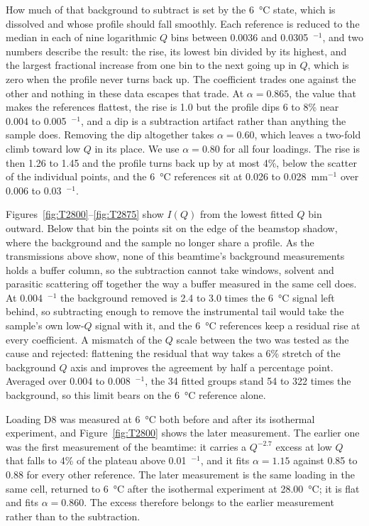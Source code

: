 \documentclass[11pt]{article}
\newcommand{\Ainv}{\text{\AA}$^{-1}$}
\begin{document}
How much of that background to subtract is set by the \SI{6}{\degreeCelsius} state, which is dissolved and whose profile should fall smoothly. Each reference is reduced to the median in each of nine logarithmic $Q$ bins between 0.0036 and 0.0305~\Ainv, and two numbers describe the result: the rise, its lowest bin divided by its highest, and the largest fractional increase from one bin to the next going up in $Q$, which is zero when the profile never turns back up. The coefficient trades one against the other and nothing in these data escapes that trade. At $\alpha=0.865$, the value that makes the references flattest, the rise is 1.0 but the profile dips 6 to 8\% near 0.004 to 0.005~\Ainv, and a dip is a subtraction artifact rather than anything the sample does. Removing the dip altogether takes $\alpha=0.60$, which leaves a two-fold climb toward low $Q$ in its place. We use $\alpha=0.80$ for all four loadings. The rise is then 1.26 to 1.45 and the profile turns back up by at most 4\%, below the scatter of the individual points, and the \SI{6}{\degreeCelsius} references sit at 0.026 to 0.028~mm$^{-1}$ over 0.006 to 0.03~\Ainv.

Figures~\ref{fig:T2800}--\ref{fig:T2875} show $I(Q)$ from the lowest fitted $Q$ bin outward. Below that bin the points sit on the edge of the beamstop shadow, where the background and the sample no longer share a profile. As the transmissions above show, none of this beamtime's background measurements holds a buffer column, so the subtraction cannot take windows, solvent and parasitic scattering off together the way a buffer measured in the same cell does. At 0.004~\Ainv{} the background removed is 2.4 to 3.0 times the \SI{6}{\degreeCelsius} signal left behind, so subtracting enough to remove the instrumental tail would take the sample's own low-$Q$ signal with it, and the \SI{6}{\degreeCelsius} references keep a residual rise at every coefficient. A mismatch of the $Q$ scale between the two was tested as the cause and rejected: flattening the residual that way takes a 6\% stretch of the background $Q$ axis and improves the agreement by half a percentage point. Averaged over 0.004 to 0.008~\Ainv, the 34 fitted groups stand 54 to 322 times the background, so this limit bears on the \SI{6}{\degreeCelsius} reference alone.

Loading D8 was measured at \SI{6}{\degreeCelsius} both before and after its isothermal experiment, and Figure~\ref{fig:T2800} shows the later measurement. The earlier one was the first measurement of the beamtime: it carries a $Q^{-2.7}$ excess at low $Q$ that falls to 4\% of the plateau above 0.01~\Ainv, and it fits $\alpha=1.15$ against 0.85 to 0.88 for every other reference. The later measurement is the same loading in the same cell, returned to \SI{6}{\degreeCelsius} after the isothermal experiment at \SI{28.00}{\degreeCelsius}; it is flat and fits $\alpha=0.860$. The excess therefore belongs to the earlier measurement rather than to the subtraction.
\end{document}
